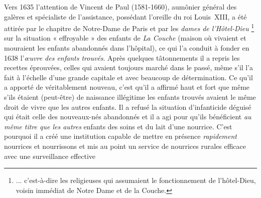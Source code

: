  Vers 1635 l'attention de Vincent de Paul (1581-1660), aumônier général des galères et spécialiste de l'assistance, possédant l'oreille du roi Louis~XIII, a été attirée par le chapitre de Notre-Dame de Paris et par les \emph{dames de l'Hôtel-Dieu}%
\footnote{... c'est-à-dire les religieuses qui assumaient le fonctionnement de l'hôtel-Dieu, voisin immédiat de Notre Dame et de la Couche.} 
sur la situation « effroyable » des enfants de \emph{La Couche} (maison où vivaient et mouraient les enfants abandonnés dans l'hôpital), ce qui l'a conduit à fonder en 1638 l'\emph{œuvre des enfants trouvés}. Après quelques tâtonnements il a repris les recettes éprouvées, celles qui avaient toujours marché dans le passé, même s'il l'a fait à l'échelle d'une grande capitale et avec beaucoup de détermination. Ce qu'il a apporté de véritablement nouveau, c'est qu'il a affirmé haut et fort que même s'ils étaient (peut-être) de naissance illégitime les enfants trouvés avaient le même droit de vivre que les autres enfants. Il a refusé la situation d'infanticide déguisé qui était celle des nouveaux-nés abandonnés et il a agi pour qu'ils bénéficient \emph{au même titre que les autres} enfants des soins et du lait d'une nourrice. C'est pourquoi il a créé une institution capable de mettre en présence \emph{rapidement} nourrices et nourrissons et mis au point un service de nourrices rurales efficace avec une surveillance effective%
